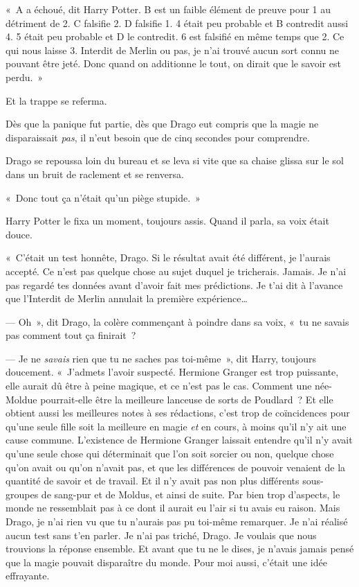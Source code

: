 \baselineskip

\restoretrivseps

«~A a échoué, dit Harry Potter.
B est un faible élément de preuve pour 1 au détriment de 2.
C falsifie 2.
D falsifie 1.
4 était peu probable et B contredit aussi 4.
5 était peu probable et D le contredit.
6 est falsifié en même temps que 2.
Ce qui nous laisse 3.
Interdit de Merlin ou pas, je n'ai trouvé aucun sort connu ne pouvant être jeté.
Donc quand on additionne le tout, on dirait que le savoir est perdu.~»

Et la trappe se referma.

Dès que la panique fut partie, dès que Drago eut compris que la magie ne disparaissait \emph{pas}, il n'eut besoin que de cinq secondes pour comprendre.

Drago se repoussa loin du bureau et se leva si vite que sa chaise glissa sur le sol dans un bruit de raclement et se renversa.

«~Donc tout ça n'était qu'un piège stupide.~»

Harry Potter le fixa un moment, toujours assis.
Quand il parla, sa voix était douce.

«~C'était un test honnête, Drago.
Si le résultat avait été différent, je l'aurais accepté.
Ce n'est pas quelque chose au sujet duquel je tricherais.
Jamais. Je n'ai pas regardé tes données avant d'avoir fait mes prédictions.
Je t'ai dit à l'avance que l'Interdit de Merlin annulait la première expérience…

--- Oh~», dit Drago, la colère commençant à poindre dans sa voix, «~tu ne savais pas comment tout ça finirait~?

--- Je ne \emph{savais} rien que tu ne saches pas toi-même~», dit Harry, toujours doucement.
«~J'admets l'avoir suspecté.
Hermione Granger est trop puissante, elle aurait dû être à peine magique, et ce n'est pas le cas.
Comment une née-Moldue pourrait-elle être la meilleure lanceuse de sorts de Poudlard~?
Et elle obtient aussi les meilleures notes à ses rédactions, c'est trop de coïncidences pour qu'une seule fille soit la meilleure en magie \emph{et} en cours, à moins qu'il n'y ait une cause commune.
L'existence de Hermione Granger laissait entendre qu'il n'y avait qu'une seule chose qui déterminait que l'on soit sorcier ou non, quelque chose qu'on avait ou qu'on n'avait pas, et que les différences de pouvoir venaient de la quantité de savoir et de travail.
Et il n'y avait pas non plus différents sous-groupes de sang-pur et de Moldus, et ainsi de suite.
Par bien trop d'aspects, le monde ne ressemblait pas à ce dont il aurait eu l'air si tu avais eu raison.
Mais Drago, je n'ai rien vu que tu n'aurais pas pu toi-même remarquer.
Je n'ai réalisé aucun test sans t'en parler.
Je n'ai pas triché, Drago.
Je voulais que nous trouvions la réponse ensemble.
Et avant que tu ne le dises, je n'avais jamais pensé que la magie pouvait disparaître du monde.
Pour moi aussi, c'était une idée effrayante.


